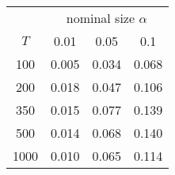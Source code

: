 % 
\begin{tabular}{cccc}
  \hline
  & \multicolumn{3}{c}{nominal size $\alpha$} \\
 $T$ & 0.01 & 0.05 & 0.1 \\
 \hline
100 & 0.005 & 0.034 & 0.068 \\ 
  200 & 0.018 & 0.047 & 0.106 \\ 
  350 & 0.015 & 0.077 & 0.139 \\ 
  500 & 0.014 & 0.068 & 0.140 \\ 
  1000 & 0.010 & 0.065 & 0.114 \\ 
   \hline
\end{tabular}
